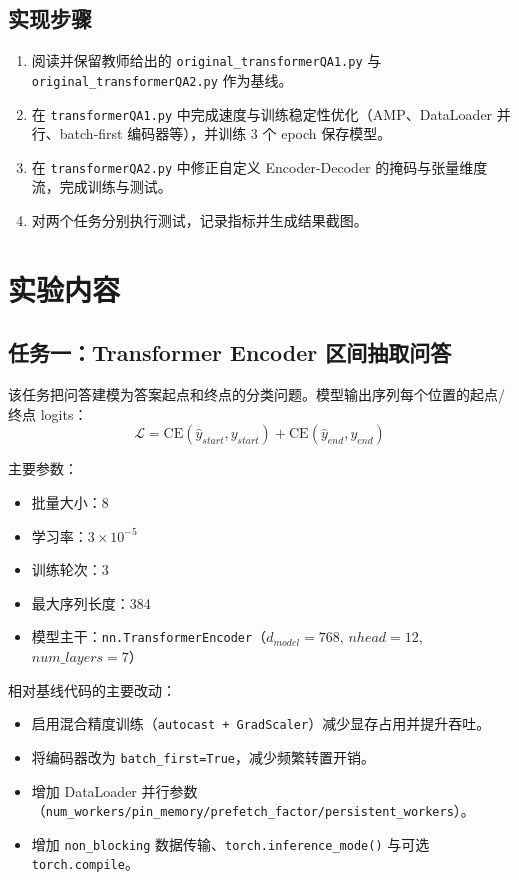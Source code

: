 \documentclass[12pt,a4paper]{ctexart}
\begin{document}
\subsection{实现步骤}
\begin{enumerate}
  \item 阅读并保留教师给出的 \texttt{original\_transformerQA1.py} 与 \texttt{original\_transformerQA2.py} 作为基线。
  \item 在 \texttt{transformerQA1.py} 中完成速度与训练稳定性优化（AMP、DataLoader 并行、batch-first 编码器等），并训练 3 个 epoch 保存模型。
  \item 在 \texttt{transformerQA2.py} 中修正自定义 Encoder-Decoder 的掩码与张量维度流，完成训练与测试。
  \item 对两个任务分别执行测试，记录指标并生成结果截图。
\end{enumerate}

\section{实验内容}
\subsection{任务一：Transformer Encoder 区间抽取问答}
该任务把问答建模为答案起点和终点的分类问题。模型输出序列每个位置的起点/终点 logits：
\begin{equation}
\mathcal{L}=\text{CE}(\hat{y}_{start}, y_{start}) + \text{CE}(\hat{y}_{end}, y_{end})
\end{equation}

主要参数：
\begin{itemize}
  \item 批量大小：8
  \item 学习率：$3\times10^{-5}$
  \item 训练轮次：3
  \item 最大序列长度：384
  \item 模型主干：\texttt{nn.TransformerEncoder}（$d_{model}=768$, $nhead=12$, $num\_layers=7$）
\end{itemize}

相对基线代码的主要改动：
\begin{itemize}
  \item 启用混合精度训练（\texttt{autocast + GradScaler}）减少显存占用并提升吞吐。
  \item 将编码器改为 \texttt{batch\_first=True}，减少频繁转置开销。
  \item 增加 DataLoader 并行参数（\texttt{num\_workers/pin\_memory/prefetch\_factor/persistent\_workers}）。
  \item 增加 \texttt{non\_blocking} 数据传输、\texttt{torch.inference\_mode()} 与可选 \texttt{torch.compile}。
\end{itemize}
\end{document}
